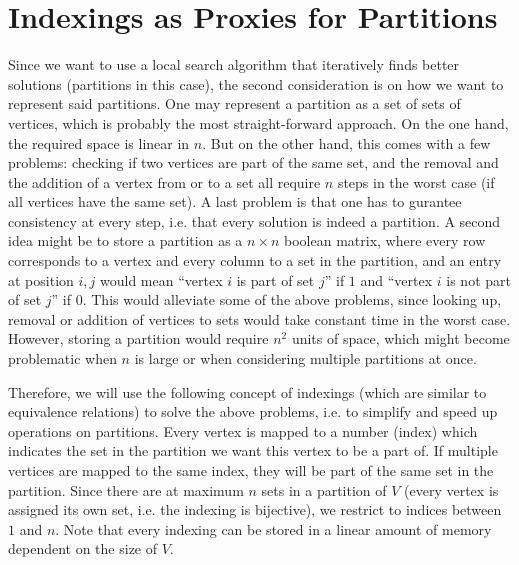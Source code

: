 \section{Indexings as Proxies for Partitions}
Since we want to use a local search algorithm that iteratively finds better solutions (partitions in this case), the second consideration is on how we want to represent said partitions. One may represent a partition as a set of sets of vertices, which is probably the most straight-forward approach. On the one hand, the required space is linear in $n$. But on the other hand, this comes with a few problems: checking if two vertices are part of the same set, and the removal and the addition of a vertex from or to a set all require $n$ steps in the worst case (if all vertices have the same set). A last problem is that one has to gurantee consistency at every step, i.e. that every solution is indeed a partition. A second idea might be to store a partition as a $n \times n$ boolean matrix, where every row corresponds to a vertex and every column to a set in the partition, and an entry at position $i,j$ would mean ``vertex $i$ is part of set $j$'' if $1$ and ``vertex $i$ is not part of set $j$'' if $0$. This would alleviate some of the above problems, since looking up, removal or addition of vertices to sets would take constant time in the worst case. However, storing a partition would require $n^2$ units of space, which might become problematic when $n$ is large or when considering multiple partitions at once.

Therefore, we will use the following concept of indexings (which are similar to equivalence relations) to solve the above problems, i.e. to simplify and speed up operations on partitions. Every vertex is mapped to a number (index) which indicates the set in the partition we want this vertex to be a part of. If multiple vertices are mapped to the same index, they will be part of the same set in the partition. Since there are at maximum $n$ sets in a partition of $V$ (every vertex is assigned its own set, i.e. the indexing is bijective), we restrict to indices between $1$ and $n$. Note that every indexing can be stored in a linear amount of memory dependent on the size of $V$.


